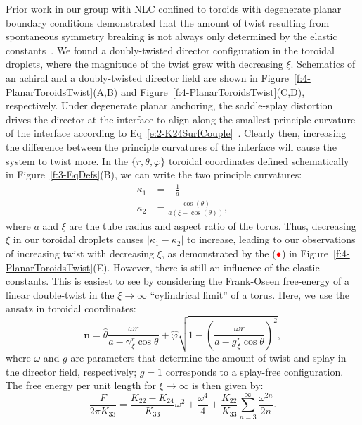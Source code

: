 Prior work in our group with NLC confined to toroids with degenerate planar boundary conditions demonstrated that the amount of twist resulting from spontaneous symmetry breaking is not always only determined by the elastic constants~\cite{RN46}.
We found a doubly-twisted director configuration in the toroidal droplets, where the magnitude of the twist grew with decreasing $\xi$.
Schematics of an achiral and a doubly-twisted director field are shown in Figure~\ref{f:4-PlanarToroidsTwist}(A,B) and Figure~\ref{f:4-PlanarToroidsTwist}(C,D), respectively.
Under degenerate planar anchoring, the saddle-splay distortion drives the director at the interface to align along the smallest principle curvature of the interface according to Eq~\ref{e:2-K24SurfCouple}~\cite{RN59}.
Clearly then, increasing the difference between the principle curvatures of the interface will cause the system to twist more.
In the $\{r, \theta, \varphi\}$ toroidal coordinates defined schematically in Figure~\ref{f:3-EqDefs}(B), we can write the two principle curvatures:
\label{e:4-toursPrincipleCurv}
\begin{align}
  \kappa_1 &= -\frac{1}{a}\tag{\theequation a} \\
  \kappa_2 &= \frac{\cos(\theta)}{a(\xi-\cos(\theta))},\tag{\theequation b}
\end{align}
where $a$ and $\xi$ are the tube radius and aspect ratio of the torus.
Thus, decreasing $\xi$ in our toroidal droplets causes $|\kappa_1-\kappa_2|$ to increase, leading to our observations of increasing twist with decreasing $\xi$, as demonstrated by the (${\color{red} \bullet}$) in Figure~\ref{f:4-PlanarToroidsTwist}(E).
However, there is still an influence of the elastic constants.
This is easiest to see by considering the Frank-Oseen free-energy of a linear double-twist in the $\xi \rightarrow \infty $ ``cylindrical limit'' of a torus.
Here, we use the ansatz in toroidal coordinates:
\begin{equation}\label{e:4-planransatz}
\mathbf{n} = \hat{\theta}\frac{\omega r}{a-\gamma \frac{r}{\xi} \cos \theta} + \hat{\varphi}\sqrt{1 - \left ( \frac{\omega r}{a-g \frac{r}{\xi} \cos \theta} \right )^2 },
\end{equation}
where $\omega$ and $g$ are parameters that determine the amount of twist and splay in the director field, respectively; $g=1$ corresponds to a splay-free configuration.
The free energy per unit length for $\xi \rightarrow \infty$ is then given by:
\begin{equation}\label{e:4-FEPlanarTwist}
  \frac{F}{2 \pi K_{33}} = \frac{K_{22}-K_{24}}{K_{33}}\omega^2 + \frac{\omega^4}{4} + \frac{K_{22}}{K_{33}}\sum\limits_{n=3}^{\infty} \frac{\omega^{2n}}{2n}.
\end{equation}
